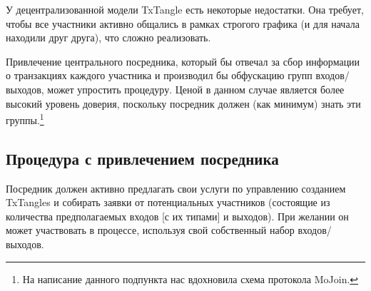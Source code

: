 У децентрализованной модели TxTangle есть некоторые недостатки. Она требует, чтобы все участники активно общались в рамках строгого графика (и для начала находили друг друга), что сложно реализовать.

Привлечение центрального посредника, который бы отвечал за сбор информации о транзак\-циях каждого участника и производил бы обфускацию групп входов/выходов, может упро\-стить процедуру. Ценой в данном случае является более высокий уровень доверия, поскольку посредник должен (как минимум) знать эти группы.\footnote{На написание данного подпункта нас вдохновила схема протокола MoJoin.}


\subsection{Процедура с привлечением посредника}
\label{subsec:dealer-procedure-txtangle}

Посредник должен активно предлагать свои услуги по управлению созданием TxTangles и собирать заявки от потенциальных участников (состоящие из количества предполагаемых входов [с их типами] и выходов). При желании он может участвовать в процессе, используя свой собственный набор входов/выходов.

